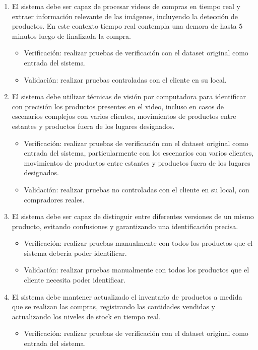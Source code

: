 \documentclass[
11pt, %
]{charter}
\begin{document}
\begin{enumerate}
			\item El sistema debe ser capaz de procesar videos de compras en tiempo real y extraer información relevante de las imágenes, incluyendo la detección de productos. En este contexto tiempo real contempla una demora de hasta 5 minutos luego de finalizada la compra.
			\begin{itemize}
	\item Verificación: realizar pruebas de verificación con el dataset original como entrada del sistema.
	\item Validación: realizar pruebas controladas con el cliente en su local.   
\end{itemize}
			\item El sistema debe utilizar técnicas de visión por computadora para identificar con precisión los productos presentes en el video, incluso en casos de escenarios complejos con varios clientes, movimientos de productos entre estantes y productos fuera de los lugares designados.
			\begin{itemize}
		\item Verificación: realizar pruebas de verificación con el dataset original como entrada del sistema, particularmente con los escenarios con varios clientes, movimientos de productos entre estantes y productos fuera de los lugares designados.
	\item Validación: realizar pruebas no controladas con el cliente en su local, con compradores reales.
\end{itemize}
			\item El sistema debe ser capaz de distinguir entre diferentes versiones de un mismo producto, evitando confusiones y garantizando una identificación precisa.
			\begin{itemize}
	\item Verificación: realizar pruebas manualmente con todos los productos que el sistema debería poder identificar.
	\item Validación: realizar pruebas manualmente con todos los productos que el cliente necesita poder identificar.
\end{itemize}
			\item El sistema debe mantener actualizado el inventario de productos a medida que se realizan las compras, registrando las cantidades vendidas y actualizando los niveles de stock en tiempo real.
			\begin{itemize}
	\item Verificación: realizar pruebas de verificación con el dataset original como entrada del sistema.  

\end{itemize}
\end{enumerate}
\end{document}

